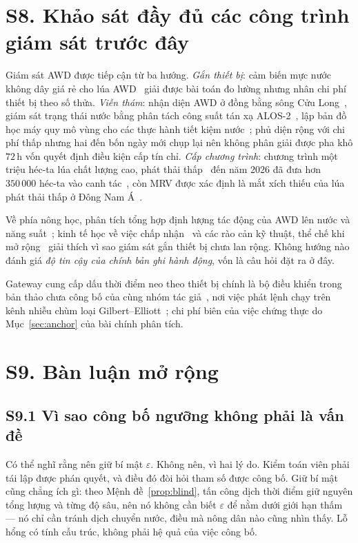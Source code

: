 \section*{S8. Khảo sát đầy đủ các công trình giám sát trước đây}

Giám sát AWD được tiếp cận từ ba hướng. \emph{Gắn thiết bị}: cảm biến mực nước không dây
giá rẻ cho lúa AWD~\cite{delacruz2022} giải được bài toán đo lường nhưng nhân chi phí
thiết bị theo số thửa. \emph{Viễn thám}: nhận diện AWD ở đồng bằng sông Cửu
Long~\cite{lovell2019}, giám sát trạng thái nước bằng phân tách công suất tán xạ
ALOS-2~\cite{islam2026alose}, lập bản đồ học máy quy mô vùng cho các thực hành tiết kiệm
nước~\cite{mlrice2025}; phủ diện rộng với chi phí thấp nhưng hai đến bốn ngày mới chụp lại
nên không phân giải được pha khô $72$\,h vốn quyết định điều kiện cấp tín chỉ. \emph{Cấp
chương trình}: chương trình một triệu héc-ta lúa chất lượng cao, phát thải
thấp~\cite{qd1490} đến năm 2026 đã đưa hơn $350\,000$ héc-ta vào canh
tác~\cite{mae2026progress}, còn MRV được xác định là mắt xích thiếu của lúa phát thải thấp
ở Đông Nam Á~\cite{irri2026mrv}.

Về phía nông học, phân tích tổng hợp định lượng tác động của AWD lên nước và năng
suất~\cite{carrijo2017}; kinh tế học về việc chấp nhận~\cite{lampayan2015} và các rào cản
kỹ thuật, thể chế khi mở rộng~\cite{enriquez2021} giải thích vì sao giám sát gắn thiết bị
chưa lan rộng. Không hướng nào đánh giá \emph{độ tin cậy của chính bản ghi hành động}, vốn
là câu hỏi đặt ra ở đây.

Gateway cung cấp dấu thời điểm neo theo thiết bị chính là bộ điều khiển trong bản thảo chưa công bố của cùng nhóm tác giả~\cite{twingate2026}, nơi việc phát lệnh chạy trên kênh nhiễu chùm loại Gilbert--Elliott~\cite{gilbert1960,elliott1963};
chi phí biên của việc chứng thực do Mục~\ref{sec:anchor} của bài chính phân tích.

\section*{S9. Bàn luận mở rộng}

\subsection*{S9.1 Vì sao công bố ngưỡng không phải là vấn đề}

Có thể nghĩ rằng nên giữ bí mật $\varepsilon$. Không nên, vì hai lý do. Kiểm toán viên phải
tái lập được phán quyết, và điều đó đòi hỏi tham số được công bố. Giữ bí mật cũng chẳng ích
gì: theo Mệnh đề~\ref{prop:blind}, tấn công dịch thời điểm giữ nguyên tổng lượng và từng độ
sâu, nên nó không cần biết $\varepsilon$ để nằm dưới giới hạn thấm --- nó chỉ cần tránh dịch
chuyển nước, điều mà nông dân nào cũng nhìn thấy. Lỗ hổng có tính cấu trúc, không phải hệ
quả của việc công bố.

